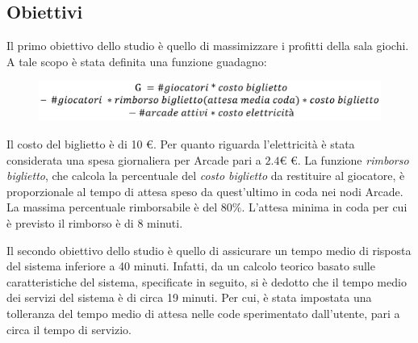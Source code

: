 \documentclass{article}
\begin{document}
\subsection{Obiettivi}
\label{Goal}
\par Il primo obiettivo dello studio è quello di massimizzare i profitti della sala giochi. A tale scopo è stata definita una funzione guadagno:

\begin{figure}[H]
	\centering
	\captionsetup{justification=centering,margin=2cm}
	\includegraphics[scale=0.33]{images/base_income.png}
	\label{figura:adv_income}
\end{figure}

Il costo del biglietto è di 10 \euro . Per quanto riguarda l'elettricità è stata considerata una spesa giornaliera per Arcade pari a $2.4 €$ \euro. La funzione \textit{rimborso biglietto}, che calcola la percentuale del \textit{costo biglietto} da restituire al giocatore, è proporzionale al tempo di attesa speso da quest'ultimo in coda nei nodi Arcade. La massima percentuale rimborsabile è del $80\%$. L'attesa minima in coda per cui è previsto il rimborso è di 8 minuti. 
\\
\par Il secondo obiettivo dello studio è quello di assicurare un tempo medio di risposta del sistema inferiore a 40 minuti. Infatti, da un calcolo teorico basato sulle caratteristiche del sistema, specificate in seguito, si è dedotto che il tempo medio dei servizi del sistema è di circa 19 minuti. Per cui, è stata impostata una tolleranza del tempo medio di attesa nelle code sperimentato dall'utente, pari a circa il tempo di servizio.



	
\end{document}
